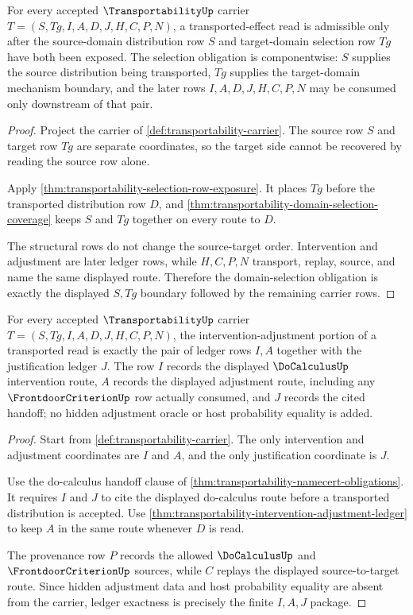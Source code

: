 \begin{theorem}
\label{thm:transportability-domain-selection-obligation}
For every accepted $\TransportabilityUp$ carrier $T=(S,Tg,I,A,D,J,H,C,P,N)$, a transported-effect read is admissible only after the source-domain distribution row $S$ and target-domain selection row $Tg$ have both been exposed. The selection obligation is componentwise: $S$ supplies the source distribution being transported, $Tg$ supplies the target-domain mechanism boundary, and the later rows $I,A,D,J,H,C,P,N$ may be consumed only downstream of that pair.
\end{theorem}
\begin{proof}
Project the carrier of \autoref{def:transportability-carrier}. The source row $S$ and target row $Tg$ are separate coordinates, so the target side cannot be recovered by reading the source row alone.

Apply \autoref{thm:transportability-selection-row-exposure}. It places $Tg$ before the transported distribution row $D$, and \autoref{thm:transportability-domain-selection-coverage} keeps $S$ and $Tg$ together on every route to $D$.

The structural rows do not change the source-target order. Intervention and adjustment are later ledger rows, while $H,C,P,N$ transport, replay, source, and name the same displayed route. Therefore the domain-selection obligation is exactly the displayed $S,Tg$ boundary followed by the remaining carrier rows.
\end{proof}

\begin{theorem}
\label{thm:transportability-adjustment-ledger-exactness}
For every accepted $\TransportabilityUp$ carrier $T=(S,Tg,I,A,D,J,H,C,P,N)$, the intervention-adjustment portion of a transported read is exactly the pair of ledger rows $I,A$ together with the justification ledger $J$. The row $I$ records the displayed $\DoCalculusUp$ intervention route, $A$ records the displayed adjustment route, including any $\FrontdoorCriterionUp$ row actually consumed, and $J$ records the cited handoff; no hidden adjustment oracle or host probability equality is added.
\end{theorem}
\begin{proof}
Start from \autoref{def:transportability-carrier}. The only intervention and adjustment coordinates are $I$ and $A$, and the only justification coordinate is $J$.

Use the do-calculus handoff clause of \autoref{thm:transportability-namecert-obligations}. It requires $I$ and $J$ to cite the displayed do-calculus route before a transported distribution is accepted. Use \autoref{thm:transportability-intervention-adjustment-ledger} to keep $A$ in the same route whenever $D$ is read.

The provenance row $P$ records the allowed $\DoCalculusUp$ and $\FrontdoorCriterionUp$ sources, while $C$ replays the displayed source-to-target route. Since hidden adjustment data and host probability equality are absent from the carrier, ledger exactness is precisely the finite $I,A,J$ package.
\end{proof}

